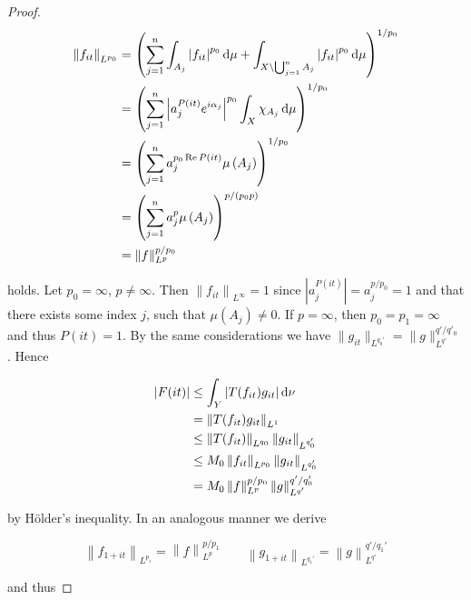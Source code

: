 \begin{proof}
\begin{gather*}
	\begin{aligned}
		\left\|f_{it}\right\|_{L^{p_0}} &= \left(\sum_{j = 1}^n \int_{A_j} \left| f_{it} \right|^{p_0} \mathop{}\!\mathrm{d}\mu + \int_{X \setminus \bigcup_{j = 1}^n A_j} \left| f_{it} \right|^{p_0} \mathop{}\!\mathrm{d}\mu\right)^{1/p_0}\\
		&= \left(\sum_{j = 1}^n \left| a_j^{P(it)} e^{i\alpha_j}\right|^{p_0}\int_X \chi_{A_j} \mathop{}\!\mathrm{d}\mu\right)^{1/p_0}\\
		&= \left(\sum_{j = 1}^n a_j^{p_0\operatorname{Re} P(it)}\mu\left(A_j\right)\right)^{1/p_0}\\
		&= \left(\sum_{j = 1}^n a_j^p\mu\left(A_j\right)\right)^{p/\left(p_0p\right)}\\
		&= \left\|f\right\|_{L^p}^{p/p_0} 
	\end{aligned}
\end{gather*}

\noindent holds. Let $p_0 = \infty$, $p \neq \infty$. Then $\left\|f_{it}\right\|_{L^{\infty}} = 1$ since $\left| a_j^{P(it)}\right| = a_j^{p/p_0} = 1$ and that there exists some index $j$, such that $\mu\left( A_j \right) \neq 0$. If $p = \infty$, then $p_0 = p_1 = \infty$ and thus $P(it) = 1$. By the same considerations we have $\|g_{it}\|_{L^{q_0'}} = \|g\|_{L^{q'}}^{q'/q'_0}$. Hence

\begin{gather*}
	\begin{aligned}
		\left| F(it) \right| &\leq \int_Y \left| T(f_{it})g_{it}\right| \mathop{}\!\mathrm{d}\nu\\
		&= \left\|T(f_{it}) g_{it}\right\|_{L^1}\\
		&\leq \left\|T(f_{it})\right\|_{L^{q_0}}\left\|g_{it}\right\|_{L^{q_0'}}\\
		&\leq M_0 \left\|f_{it}\right\|_{L^{p_0}} \left\|g_{it}\right\|_{L^{q_0'}}\\
		&= M_0 \left\|f\right\|_{L^p}^{p/p_0} \left\|g\right\|_{L^{q'}}^{q'/q'_0}
	\end{aligned}
\end{gather*}

\noindent by H\"older's inequality. In an analogous manner we derive
				
\begin{equation*}
	\left\|f_{1 + it}\right\|_{L^{p_1}} = \left\|f\right\|_{L^p}^{p/p_1} \qquad \left\|g_{1 + it}\right\|_{L^{q_1'}} = \left\|g\right\|_{L^{q'}}^{q'/q_1'}
\end{equation*}

\noindent and thus 
				

\end{proof}
